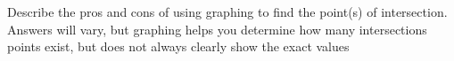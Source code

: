 {Describe the pros and cons of using graphing to find the point(s) of intersection.}
{Answers will vary, but graphing helps you determine how many intersections points exist, but does not always clearly show the exact values}
